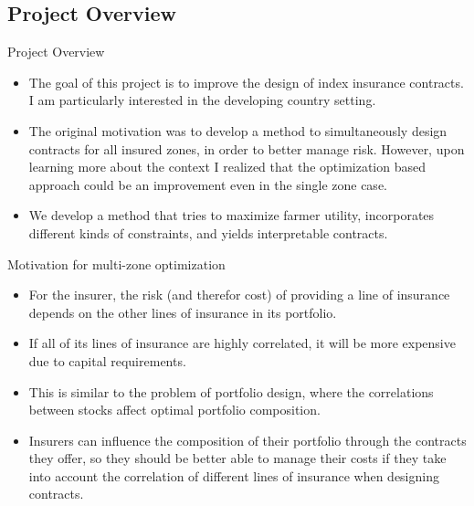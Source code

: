 \documentclass{beamer}
\begin{document}
\subsection*{Project Overview}
\begin{frame}{Project Overview}
 \begin{itemize}
    \setlength\itemsep{1em}   
    \item The goal of this project is to improve the design of index insurance contracts. I am particularly interested in the developing country setting.  
    \item The original motivation was to develop a method to simultaneously design contracts for all insured zones, in order to better manage risk. However, upon learning more about the context I realized that the optimization based approach could be an improvement even in the single zone case. 
    \item We develop a method that tries to maximize farmer utility, incorporates different kinds of constraints, and yields interpretable contracts. 
 \end{itemize}
\end{frame}

\begin{frame}{Motivation for multi-zone optimization}
    \begin{itemize}
        \item For the insurer, the risk (and therefor cost) of providing a line of insurance depends on the other lines of insurance in its portfolio. 
        \item If all of its lines of insurance are highly correlated, it will be more expensive due to capital requirements. 
        \item This is similar to the problem of portfolio design, where the correlations between stocks affect optimal portfolio composition. 
        \item Insurers can influence the composition of their portfolio through the contracts they offer, so they should be better able to manage
        their costs if they take into account the correlation of different lines of insurance when designing contracts.
    \end{itemize}
    
\end{frame}
\end{document}
